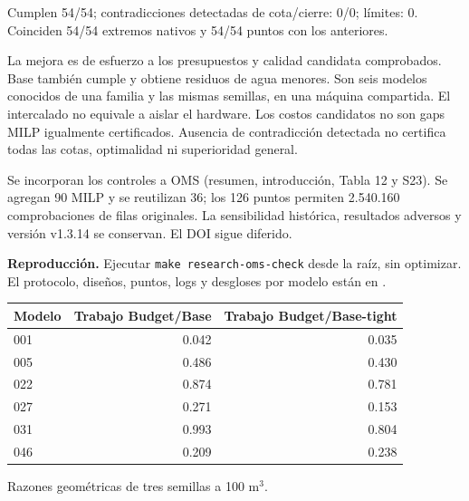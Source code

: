 \documentclass[10pt,a4paper]{article}
\begin{document}
Cumplen 54/54; contradicciones detectadas de cota/cierre: 0/0; límites: 0.
Coinciden 54/54 extremos nativos y 54/54 puntos con los anteriores.

La mejora es de esfuerzo a los presupuestos y calidad candidata comprobados.
Base también cumple y obtiene residuos de agua menores. Son seis modelos
conocidos de una familia y las mismas semillas, en una máquina compartida.
El intercalado no equivale a aislar el hardware. Los costos candidatos no
son gaps MILP igualmente certificados. Ausencia de contradicción detectada
no certifica todas las cotas, optimalidad ni superioridad general.

Se incorporan los controles a OMS (resumen, introducción, Tabla 12 y S23).
Se agregan 90 MILP y se reutilizan 36; los 126 puntos permiten 2.540.160
comprobaciones de filas originales. La sensibilidad histórica, resultados
adversos y versión v1.3.14 se conservan. El DOI sigue diferido.

\textbf{Reproducción.} Ejecutar \texttt{make research-oms-check} desde la raíz,
sin optimizar. El protocolo, diseños, puntos, logs y desgloses por modelo
están en .
\begin{center}\begin{tabular}{lrr}\toprule
Modelo & Trabajo Budget/Base & Trabajo Budget/Base-tight\\\midrule
001 & 0.042 & 0.035\\
005 & 0.486 & 0.430\\
022 & 0.874 & 0.781\\
027 & 0.271 & 0.153\\
031 & 0.993 & 0.804\\
046 & 0.209 & 0.238\\
\bottomrule\end{tabular}\end{center}
Razones geométricas de tres semillas a 100 m$^3$.
\end{document}

